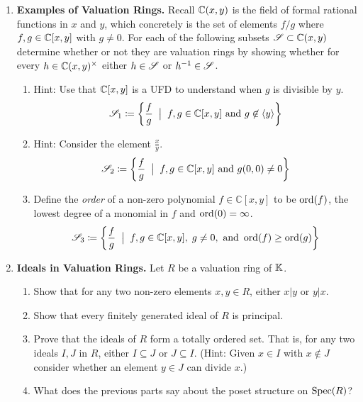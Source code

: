 \documentclass[12pt,reqno]{amsart}
\begin{document}
\begin{enumerate}[leftmargin=*]
\item \textbf{Examples of Valuation Rings.} Recall $\mathbb{C}(x,y)$ is the field of formal rational functions in $x$ and $y$, which concretely is the set of elements $f/g$ where $f,g\in \mathbb{C}[x,y]$ with $g\neq 0$.  For each of the following subsets $\mathcal{S} \subset \mathbb{C}(x,y)$ determine whether or not they are valuation rings by showing whether for every $h \in \mathbb{C}(x,y)^{\times}$ either $h \in \mathcal{S}$ or $h^{-1} \in \mathcal{S}$.
\begin{enumerate}[label=(\alph*),ref=\theenumi\alph*]
    \item Hint: Use that $\mathbb{C}[x,y]$ is a UFD to understand when $g$ is divisible by $y$.
    \[
    \mathcal{S}_{1} \coloneqq \left\{ \frac{f}{g} \;\; \big| \;\; f,g \in \mathbb{C}[x,y] \text{ and } g\not \in \langle y \rangle \right\}
    \]


    \item Hint: Consider the element $\frac{x}{y}$. 
    \[
    \mathcal{S}_{2} \coloneqq \left\{ \frac{f}{g} \;\; \big| \;\; f,g \in \mathbb{C}[x,y] \text{ and } g(0,0) \neq 0 \right\}
    \]

    \item Define the \emph{order} of a non-zero polynomial $f \in \mathbb{C}[x,y]$ to be $\operatorname{ord}(f)$, the lowest degree of a monomial in $f$ and $\operatorname{ord}(0)=\infty$. 
    \[
    \mathcal{S}_{3} \coloneqq \left\{ \frac{f}{g} \;\; \big| \;\; f,g \in \mathbb{C}[x,y], \; g\neq0, \text{ and } \operatorname{ord}(f) \geq \operatorname{ord}(g) \right\}
    \]
\end{enumerate}

 \item \textbf{Ideals in Valuation Rings.} Let $R$ be a valuation ring of $\mathbb{K}$. 
      \begin{enumerate}[label=(\alph*),ref=\theenumi\alph*]
      \item Show that for any two non-zero elements $x, y \in R$, either $x|y$ or $y|x$.
      \item Show that every finitely generated ideal of  $R$  is principal.
      \item Prove that the ideals of $R$ form a totally ordered set. That is, for any two ideals $I, J$ in $R$, either $I \subseteq J$ or $J\subseteq I$. (Hint: Given $x\in I$ with $x\not\in J$ consider whether an element $y\in J$ can divide $x$.)
      \item What does the previous parts say about the poset structure on $\operatorname{Spec}(R)$?
\end{enumerate}


\end{enumerate}
\end{document}
